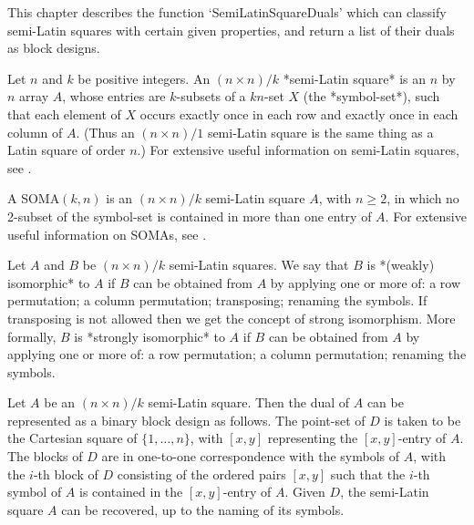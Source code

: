 %
%
%
%
\def\GRAPE{\sf GRAPE}
\def\DESIGN{\sf DESIGN}
\def\nauty{\it nauty}
\def\Aut{{\rm Aut}\,} 


This chapter describes the function `SemiLatinSquareDuals' which can
classify semi-Latin squares with certain given properties, and return
a list of their duals as block designs.


Let $n$ and $k$ be positive integers. An $(n\times n)/k$ *semi-Latin
square*
is an $n$ by $n$ array $A$, whose
entries are $k$-subsets of a $kn$-set $X$ (the *symbol-set*), such that
each element of $X$ occurs exactly once in each row and exactly once in
each column of $A$. (Thus an $(n\times n)/1$ semi-Latin square is the same
thing as a Latin square of order $n$.) For extensive useful information on
semi-Latin squares, see .

A SOMA$(k,n)$
is an $(n\times n)/k$ semi-Latin square $A$,
with $n\ge2$, in which no 2-subset of the symbol-set is contained in
more than one entry of $A$.  For extensive useful information on SOMAs,
see .

Let $A$ and $B$ be $(n\times n)/k$ semi-Latin squares.  We say that
$B$ is *(weakly) isomorphic* to $A$ if $B$ can be obtained from $A$
by applying one or more of: a row permutation; a column permutation;
transposing; renaming the symbols. If transposing is not allowed then we
get the concept of strong isomorphism. More formally, $B$ is *strongly
isomorphic* to $A$ if $B$ can be obtained from $A$ by applying one or
more of: a row permutation; a column permutation; renaming the symbols.

Let $A$ be an $(n\times n)/k$  semi-Latin square.  Then the dual of $A$
can be represented as a binary block design as follows. The point-set of
$D$ is taken to be the Cartesian square of $\{1,\ldots,n\}$, with $[x,y]$
representing the $[x,y]$-entry of $A$. The blocks of $D$ are in one-to-one
correspondence with the symbols of $A$, with the $i$-th block of $D$
consisting of the ordered pairs $[x,y]$ such that the $i$-th symbol of
$A$ is contained in the $[x,y]$-entry of $A$. Given $D$, the semi-Latin
square $A$ can be recovered, up to the naming of its symbols.

